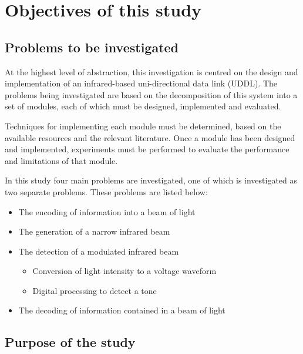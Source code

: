 \section{Objectives of this study}

\subsection{Problems to be investigated}

At the highest level of abstraction, this investigation is centred on the design and implementation of an infrared-based uni-directional data link (UDDL). The problems being investigated are based on the decomposition of this system into a set of modules, each of which must be designed, implemented and evaluated.

Techniques for implementing each module must be determined, based on the available resources and the relevant literature. Once a module has been designed and implemented, experiments must be performed to evaluate the performance and limitations of that module.

In this study four main problems are investigated, one of which is investigated as two separate problems. These problems are listed below:
\begin{itemize}
	\item The encoding of information into a beam of light
	\item The generation of a narrow infrared beam
	\item The detection of a modulated infrared beam
	\begin{itemize}
		\item Conversion of light intensity to a voltage waveform
		\item Digital processing to detect a tone
	\end{itemize}	
	\item The decoding of information contained in a beam of light
\end{itemize}






\subsection{Purpose of the study}

